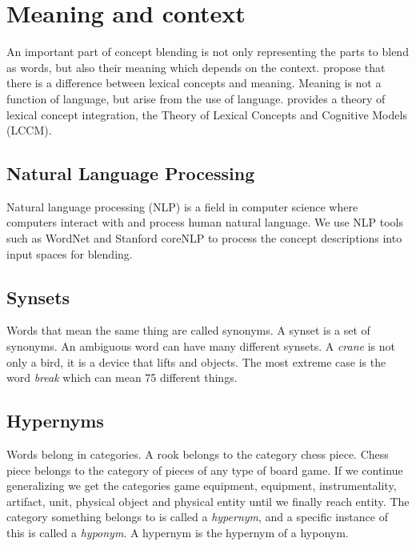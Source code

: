 

\section{Meaning and context}
An important part of concept blending is not only representing the parts to blend as words, but also their meaning which depends on the context. \parencite{Reference6} propose that there is a difference between lexical concepts and meaning. Meaning is not a function of language, but arise from the use of language. \parencite{Reference6} provides a theory of lexical concept integration, the Theory of Lexical Concepts and Cognitive Models (LCCM). 




\subsection{Natural Language Processing}
Natural language processing (NLP) is a field in computer science where computers interact with and process human natural language. We use NLP tools such as WordNet and Stanford coreNLP to process the concept descriptions into input spaces for blending.

\subsection{Synsets}
Words that mean the same thing are called synonyms. A synset is a set of synonyms. An ambiguous word can have many different synsets. A \emph{crane} is not only a bird, it is a device that lifts and objects. The most extreme case is the word \emph{break} which can mean 75 different things.

\subsection{Hypernyms}
Words belong in categories. A rook belongs to the category chess piece. Chess piece belongs to the category of pieces of any type of board game. If we continue generalizing we get the categories game equipment, equipment, instrumentality, artifact, unit, physical object and physical entity until we finally reach entity. The category something belongs to is called a \emph{hypernym}, and a specific instance of this is called a \emph{hyponym}. A hypernym is the hypernym of a hyponym.

